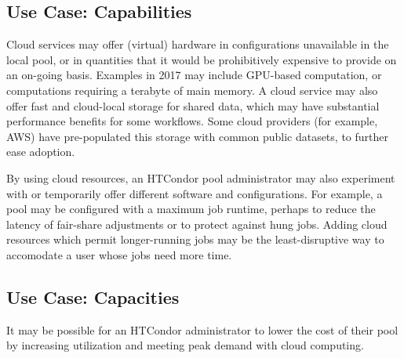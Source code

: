 \subsection{Use Case: Capabilities}

Cloud services may offer (virtual) hardware in configurations unavailable in
the local pool, or in quantities that it would be prohibitively expensive to
provide on an on-going basis.  Examples in 2017 may include GPU-based
computation, or computations requiring a terabyte of main memory.  A cloud
service may also offer fast and cloud-local storage for shared data, which
may have substantial performance benefits for some workflows.  Some cloud
providers (for example, AWS) have pre-populated this storage with common
public datasets, to further ease adoption.

By using cloud resources, an HTCondor pool administrator may also experiment
with or temporarily offer different software and configurations.  For
example, a pool may be configured with a maximum job runtime, perhaps to
reduce the latency of fair-share adjustments or to protect against hung
jobs.  Adding cloud resources which permit longer-running jobs may be the
least-disruptive way to accomodate a user whose jobs need more time.

\subsection{Use Case: Capacities}

It may be possible for an HTCondor administrator to lower the cost of their
pool by increasing utilization and meeting peak demand with cloud computing.

